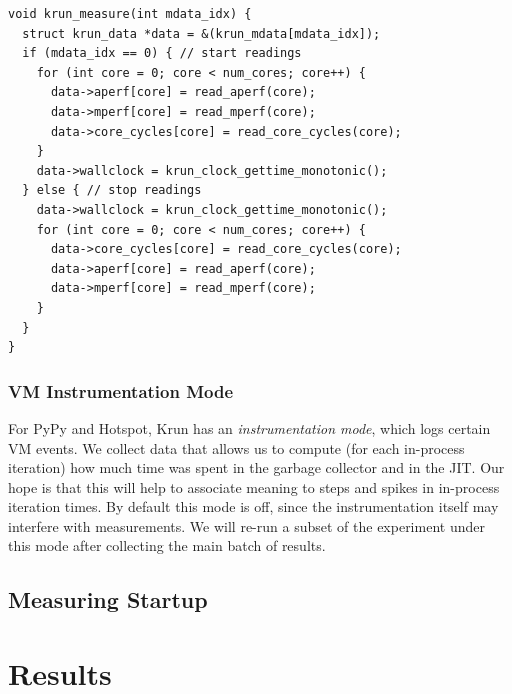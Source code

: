\documentclass[preprint,numbers,10pt]{sigplanconf}
\newcommand{\krun}{Krun\xspace}
\begin{document}
\begin{lstlisting}[label=lst:krun-measure, xleftmargin=0cm,
        caption={%
\texttt{krun\_measure}: We cannot easily collect the measurements atomically,
so we take the most important reading, wallclock time, innermost. The
\texttt{aperf} and \texttt{mperf} readings will be used to compute a ratio, and
must be collected in the same order both before and after.}]
void krun_measure(int mdata_idx) {
  struct krun_data *data = &(krun_mdata[mdata_idx]);
  if (mdata_idx == 0) { // start readings
    for (int core = 0; core < num_cores; core++) {
      data->aperf[core] = read_aperf(core);
      data->mperf[core] = read_mperf(core);
      data->core_cycles[core] = read_core_cycles(core);
    }
    data->wallclock = krun_clock_gettime_monotonic();
  } else { // stop readings
    data->wallclock = krun_clock_gettime_monotonic();
    for (int core = 0; core < num_cores; core++) {
      data->core_cycles[core] = read_core_cycles(core);
      data->aperf[core] = read_aperf(core);
      data->mperf[core] = read_mperf(core);
    }
  }
}
\end{lstlisting}

\subsubsection{VM Instrumentation Mode}

For PyPy and Hotspot, \krun has an \emph{instrumentation mode}, which logs certain
VM events. We collect data that allows us to compute (for each in-process
iteration) how much time was spent in the garbage collector and in the JIT.
Our hope is that this will help to associate meaning to
steps and spikes in in-process iteration times. By default this mode is off,
since the instrumentation itself may interfere with measurements.
We will re-run a subset of the experiment under this mode after collecting the
main batch of results.

\subsection{Measuring Startup}


\section{Results}
\label{sec:Results}

%
\end{document}
